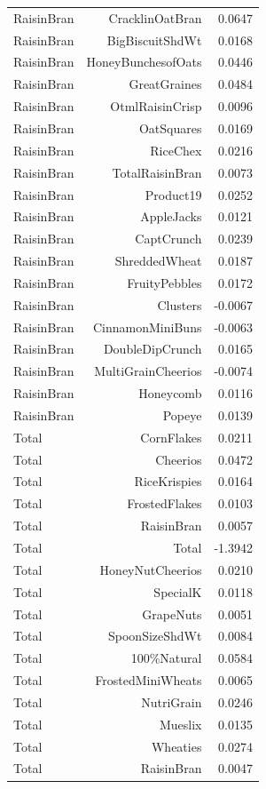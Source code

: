 \begin{longtable}{@{}lrr@{}}
RaisinBran & CracklinOatBran & 0.0647 \\
RaisinBran & BigBiscuitShdWt & 0.0168 \\
RaisinBran & HoneyBunchesofOats & 0.0446 \\
RaisinBran & GreatGraines & 0.0484 \\
RaisinBran & OtmlRaisinCrisp & 0.0096 \\
RaisinBran & OatSquares & 0.0169 \\
RaisinBran & RiceChex & 0.0216 \\
RaisinBran & TotalRaisinBran & 0.0073 \\
RaisinBran & Product19 & 0.0252 \\
RaisinBran & AppleJacks & 0.0121 \\
RaisinBran & CaptCrunch & 0.0239 \\
RaisinBran & ShreddedWheat & 0.0187 \\
RaisinBran & FruityPebbles & 0.0172 \\
RaisinBran & Clusters & -0.0067 \\
RaisinBran & CinnamonMiniBuns & -0.0063 \\
RaisinBran & DoubleDipCrunch & 0.0165 \\
RaisinBran & MultiGrainCheerios & -0.0074 \\
RaisinBran & Honeycomb & 0.0116 \\
RaisinBran & Popeye & 0.0139 \\
Total & CornFlakes & 0.0211 \\
Total & Cheerios & 0.0472 \\
Total & RiceKrispies & 0.0164 \\
Total & FrostedFlakes & 0.0103 \\
Total & RaisinBran & 0.0057 \\
Total & Total & -1.3942 \\
Total & HoneyNutCheerios & 0.0210 \\
Total & SpecialK & 0.0118 \\
Total & GrapeNuts & 0.0051 \\
Total & SpoonSizeShdWt & 0.0084 \\
Total & 100\%Natural & 0.0584 \\
Total & FrostedMiniWheats & 0.0065 \\
Total & NutriGrain & 0.0246 \\
Total & Mueslix & 0.0135 \\
Total & Wheaties & 0.0274 \\
Total & RaisinBran & 0.0047 \\

\end{longtable}
